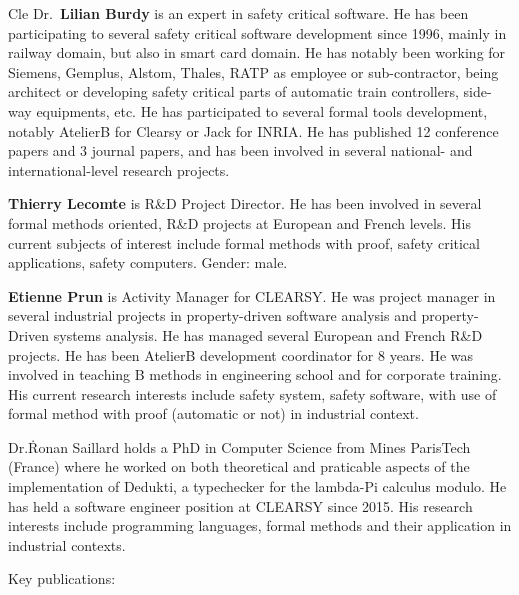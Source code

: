 \begin{sitedescription}{Cle}
Dr.\ \textbf{Lilian Burdy} is an expert in safety critical software. He has been participating to several safety critical software 
development since 1996, mainly in railway domain, but also in smart card domain. He has notably been working for Siemens, Gemplus, 
Alstom, Thales, RATP as employee or sub-contractor, being architect or developing safety critical parts of automatic train controllers, 
side-way equipments, etc. He has participated to several formal tools development, notably AtelierB for Clearsy or Jack for INRIA. He 
has published 12 conference papers and 3 journal papers, and has been involved in several national- and international-level research 
projects.

\textbf{Thierry Lecomte} is R\&D Project Director. He has been involved in several formal methods oriented, R\&D projects at European 
and French levels. His current subjects of interest include formal methods with proof, safety critical applications, safety computers. 
Gender: male.

\textbf{Etienne Prun} is Activity Manager for CLEARSY. He was project manager in several industrial projects in property-driven 
software analysis and property-Driven systems analysis. He has managed several European and French R&D projects. He has been AtelierB 
development coordinator for 8 years. He was involved in teaching B methods in engineering school and for corporate training. His current 
research interests include safety system, safety software, with use of formal method with proof (automatic or not) in industrial 
context.

Dr.\. {Ronan Saillard} holds a PhD in Computer Science from Mines ParisTech (France) where he worked on both theoretical and praticable 
aspects of the implementation of Dedukti, a typechecker for the lambda-Pi calculus modulo. He has held a software engineer position at 
CLEARSY since 2015. His research interests include programming languages, formal methods and their application in industrial contexts.

Key publications:


\end{sitedescription}
